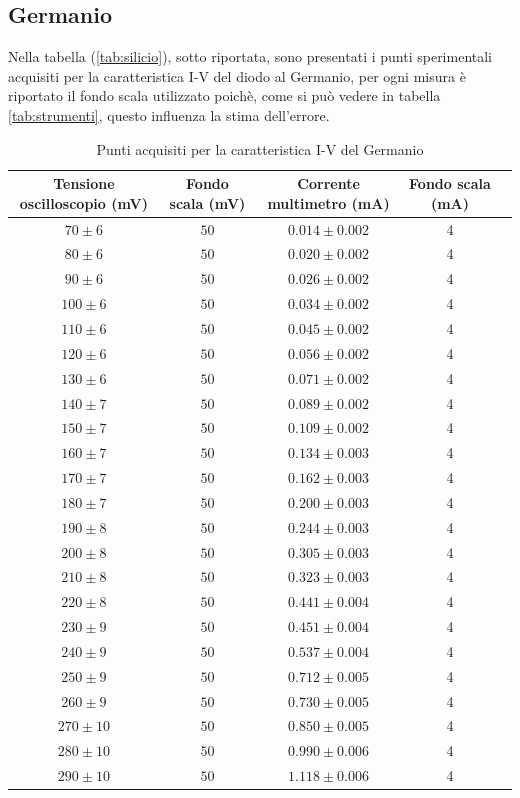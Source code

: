 \documentclass[]{article}
\begin{document}
\subsection{Germanio}
Nella tabella (\ref{tab:silicio}), sotto riportata, sono presentati i punti sperimentali acquisiti per la caratteristica I-V del diodo al Germanio, per ogni misura è riportato il fondo scala utilizzato poichè, come si può vedere in tabella \ref{tab:strumenti}, questo influenza la stima dell'errore.
	\begin{table}[H]
		\centering
	\begin{tabular}{|c|c|c|c|c|}
		\hline
		Tensione oscilloscopio (mV)& Fondo scala (mV) & Corrente multimetro (mA) &Fondo scala (mA)\\
		\hline
		$ 70\pm 6 $ &$ 50 $ & $ 0.014\pm 0.002 $ &4 \\
		\hline
		$ 80\pm 6$ &$ 50 $ & $ 0.020\pm 0.002 $&4 \\
		\hline
		$ 90\pm 6$ &$ 50 $ & $ 0.026\pm 0.002 $&4 \\
		\hline
		$ 100\pm 6 $ &$ 50 $ & $ 0.034\pm 0.002 $&4 \\
		\hline
		$110\pm 6 $ &$ 50 $ & $ 0.045\pm 0.002 $&4 \\
		\hline
		$ 120\pm 6 $ &$ 50 $ & $ 0.056\pm 0.002 $&4 \\
		\hline
		$ 130\pm 6$ &$ 50 $ & $ 0.071\pm 0.002 $&4 \\
		\hline
		$ 140\pm 7$ &$ 50 $ & $ 0.089\pm 0.002 $&4 \\
		\hline
		$ 150\pm 7$ &$ 50 $ & $ 0.109\pm 0.002 $&4 \\
		\hline
		$ 160\pm 7$ &$ 50 $ & $ 0.134\pm 0.003 $&4 \\
		\hline
		$ 170\pm 7$ &$ 50 $ & $ 0.162\pm 0.003 $&4 \\
		\hline
		$ 180\pm 7$ &$ 50 $ & $ 0.200\pm 0.003 $&4 \\
		\hline
		$ 190\pm 8$ &$ 50 $ & $ 0.244\pm 0.003 $&4 \\
		\hline
		$ 200\pm 8$ &$ 50 $ & $ 0.305\pm 0.003 $&4 \\
		\hline
		$ 210\pm 8$ &$ 50 $ & $ 0.323\pm 0.003 $&4 \\
		\hline
		$ 220\pm 8$ &$ 50 $ & $ 0.441\pm 0.004 $&4 \\
		\hline
		$ 230\pm 9$ &$ 50 $ & $ 0.451\pm 0.004 $&4 \\
		\hline
		$ 240\pm 9$ &$ 50 $ & $ 0.537\pm 0.004 $&4 \\
		\hline
		$ 250\pm 9$ &$ 50 $ & $ 0.712\pm 0.005 $&4 \\
		\hline
		$ 260\pm 9$ &$ 50 $ & $ 0.730\pm 0.005 $&4 \\
		\hline
		$ 270\pm 10$ &$ 50 $ & $ 0.850\pm 0.005 $&4 \\
		\hline
		$ 280\pm 10$ &$ 50 $ & $ 0.990\pm 0.006 $&4 \\
		\hline
		$ 290\pm 10$ &$ 50 $ & $ 1.118\pm 0.006 $&4 \\
		\hline
	\end{tabular}
\caption{Punti acquisiti per la caratteristica I-V del Germanio}
\label{tab:germanio}
\end{table}
\end{document}
